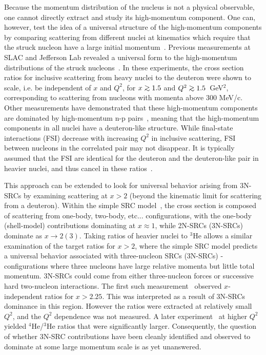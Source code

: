 Because the momentum distribution of the nucleus is not a physical observable, one cannot directly extract
and study its high-momentum component. One can, however, test the idea of a universal structure of the
high-momentum components by comparing scattering from different nuclei at kinematics which require that the
struck nucleon have a large initial momentum~\cite{RevModPhys.80.189}. Previous measurements at SLAC and
Jefferson Lab revealed a universal form to the high-momentum distributions of the struck
nucleons~\cite{SLAC_Measurement_PRC.48.2451, egiyan2003, PhysRevLett.96.082501, fomin2012, src_john,
arrington99, arrington01}. In these experiments, the cross section ratios for inclusive scattering from
heavy nuclei to the deuteron were shown to scale, i.e. be independent of $x$ and $Q^2$, for $x \gtorder 1.5$
and $Q^2 \gtorder 1.5$~GeV$^2$, corresponding to scattering from nucleons with momenta above 300 MeV/c.
Other measurements have demonstrated that these high-momentum components are dominated by high-momentum n-p
pairs~\cite{aclander99, tang03, Subedi13062008, korover2014, hen14_science, piasetzky06}, meaning that the high-momentum
components in all nuclei have a deuteron-like structure. While final-state interactions (FSI)
decrease with increasing $Q^2$ in inclusive scattering, FSI between nucleons in the correlated pair may not
disappear. It is typically assumed that the FSI are identical for the deuteron and the deuteron-like pair in
heavier nuclei, and thus cancel in these ratios~\cite{RevModPhys.80.189, src_john}.

This approach can be extended to look for universal behavior arising from 3N-SRCs by examining scattering at
$x>2$ (beyond the kinematic limit for scattering from a deuteron). Within the simple SRC
model~\cite{Frankfurt1981215}, the cross section is composed of scattering from one-body, two-body,
etc... configurations, with the one-body (shell-model) contributions dominating at $x \approx 1$, while
2N-SRCs (3N-SRCs) dominate as $x \to 2 (3)$. Taking ratios of heavier nuclei to $^3$He allows a similar
examination of the target ratios for $x>2$, where the simple SRC model predicts a universal behavior
associated with three-nucleon SRCs (3N-SRCs) - configurations where three nucleons have large relative
momenta but little total momentum. 3N-SRCs could come from either three-nucleon forces or successive hard
two-nucleon interactions. The first such measurement~\cite{PhysRevLett.96.082501} observed $x$-independent
ratios for $x > 2.25$. This was interpreted as a result of 3N-SRCs dominance in this region.
However the ratios were extracted at relatively small $Q^2$, and the $Q^2$ dependence was not measured. A
later experiment~\cite{fomin2012} at higher $Q^2$ yielded $^4$He/$^3$He ratios that were significantly
larger. Consequently, the question of whether 3N-SRC contributions have been cleanly identified and observed
to dominate at some large momentum scale is as yet unanswered.

